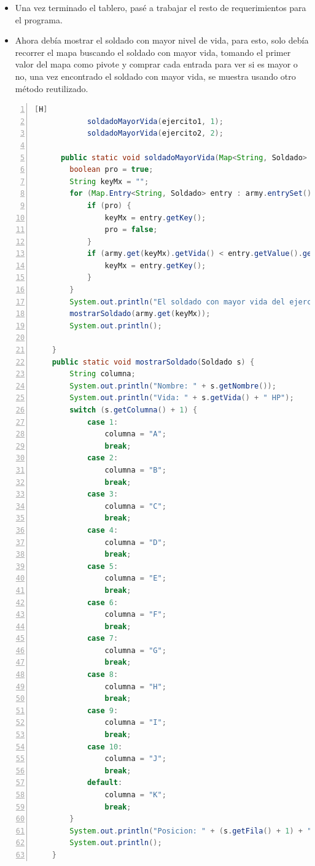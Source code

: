 \documentclass{article}
\begin{document}
	\begin{itemize}	
		\item Una vez terminado el tablero, pasé a trabajar el resto de requerimientos para el programa.
		\item Ahora debía mostrar el soldado con mayor nivel de vida, para esto, solo debía recorrer el mapa buscando el soldado con mayor vida, tomando el primer valor del mapa como pivote y comprar cada entrada para ver si es mayor o no, una vez encontrado el soldado con mayor vida, se muestra usando otro método reutilizado.
	\end{itemize}
	\begin{lstlisting}[language=java,caption={Soldado con mayor vida}, numbers=left][H]
			soldadoMayorVida(ejercito1, 1);
			soldadoMayorVida(ejercito2, 2);
			
	  public static void soldadoMayorVida(Map<String, Soldado> army, int ej) {
        boolean pro = true;
        String keyMx = "";
        for (Map.Entry<String, Soldado> entry : army.entrySet()) {
            if (pro) {
                keyMx = entry.getKey();
                pro = false;
            }
            if (army.get(keyMx).getVida() < entry.getValue().getVida()) {
                keyMx = entry.getKey();
            }
        }
        System.out.println("El soldado con mayor vida del ejercito " + ej + " es: ");
        mostrarSoldado(army.get(keyMx));
        System.out.println();

    }
    public static void mostrarSoldado(Soldado s) {
        String columna;
        System.out.println("Nombre: " + s.getNombre());
        System.out.println("Vida: " + s.getVida() + " HP");
        switch (s.getColumna() + 1) {
            case 1:
                columna = "A";
                break;
            case 2:
                columna = "B";
                break;
            case 3:
                columna = "C";
                break;
            case 4:
                columna = "D";
                break;
            case 5:
                columna = "E";
                break;
            case 6:
                columna = "F";
                break;
            case 7:
                columna = "G";
                break;
            case 8:
                columna = "H";
                break;
            case 9:
                columna = "I";
                break;
            case 10:
                columna = "J";
                break;
            default:
                columna = "K";
                break;
        }
        System.out.println("Posicion: " + (s.getFila() + 1) + "-" + columna);
        System.out.println();
    }
	\end{lstlisting}
\end{document}

